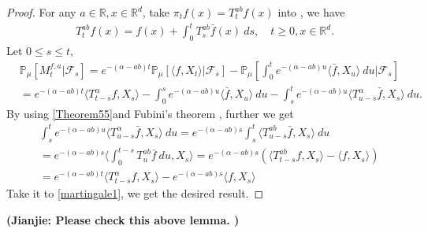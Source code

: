 \documentclass[12pt, a4paper]{amsart}
\theoremstyle{definition}
\numberwithin{equation}{section}
\begin{document}
\begin{proof}
For any $a\in \mathbb{R},x\in \mathbb{R}^d$, take $\pi_tf(x)=T_t^{ab}f(x)$ into \cite[Theorem A.55]{Li2011Measure-valued}, we have
\begin{align}\label{Theorem55}
    T_t^{ab}f(x)= f(x)+\int_0^t T_s^{ab}\bar{f}(x)~ds,\quad t\geq 0,x\in \mathbb{R}^d.
\end{align}
Let $0\leq s\leq t$,
\begin{align}
\label{martingale1}
    &\mathbb{P}_{\mu}\left[M_t^{f,a}|\mathcal{F}_s\right]
    =e^{-(\alpha-ab)t}\mathbb{P}_{\mu}\left[\langle f,X_t\rangle|\mathcal{F}_s\right]-\mathbb{P}_{\mu}\left[\int_0^t e^{-(\alpha-ab)u}\langle \bar{f}, X_u\rangle~ du|\mathcal{F}_s\right]
    \\&=e^{-(\alpha-ab)t}\langle T_{t-s}^{\alpha}f, X_s\rangle-\int_0^s e^{-(\alpha-ab)u}\langle \bar{f}, X_u\rangle~ du -\int_s^t e^{-(\alpha-ab)u}\langle T_{u-s}^{\alpha} \bar{f},X_s\rangle~ du.
\end{align}
By using \eqref{Theorem55}and Fubini's theorem , further we get
\begin{align}
    &\int_s^t e^{-(\alpha-ab)u}\langle T_{u-s}^{\alpha} \bar{f},X_s\rangle~ du=e^{-(\alpha-ab)s}\int_s^t\langle T_{u-s}^{ab}\bar{f},X_s\rangle~du\\
    &=e^{-(\alpha-ab)s}\langle\int_0^{t-s}T_{u}^{ab}\bar{f}~du,X_s\rangle=e^{-(\alpha-ab)s}\left(\langle T_{t-s}^{ab}f,X_s\rangle-\langle
    f,X_s\rangle\right)\\
    &=e^{-(\alpha-ab)t}\langle T_{t-s}^{\alpha}f, X_s\rangle-e^{-(\alpha-ab)s}\langle
    f,X_s\rangle
\end{align}
Take it to \eqref{martingale1}, we get the desired result.
\end{proof}
{\bf (Jianjie: Please check this above lemma. )}
\end{document}
